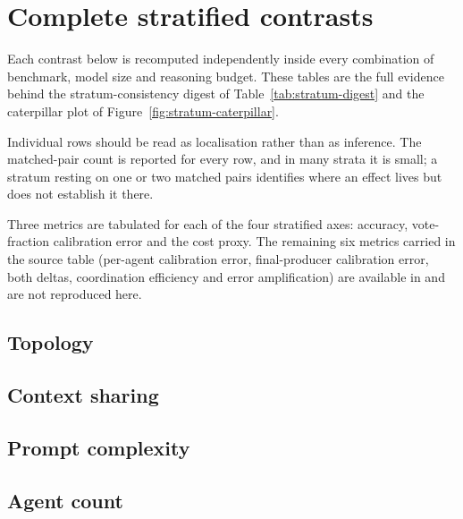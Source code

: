 \section{Complete stratified contrasts}
\label{app:stratified}

Each contrast below is recomputed independently inside every combination of benchmark,
model size and reasoning budget. These tables are the full evidence behind the
stratum-consistency digest of Table~\ref{tab:stratum-digest} and the caterpillar plot of
Figure~\ref{fig:stratum-caterpillar}.

Individual rows should be read as localisation rather than as inference. The
matched-pair count is reported for every row, and in many strata it is small; a stratum
resting on one or two matched pairs identifies where an effect lives but does not
establish it there.

Three metrics are tabulated for each of the four stratified axes: accuracy, vote-fraction
calibration error and the cost proxy. The remaining six metrics carried in the source table
(per-agent calibration error, final-producer calibration error, both deltas, coordination
efficiency and error amplification) are available in
 and are not
reproduced here.

\subsection{Topology}

\clearpage
{}
\clearpage
{}

\clearpage
\subsection{Context sharing}

\clearpage
{}
\clearpage
{}

\clearpage
\subsection{Prompt complexity}

\clearpage
{}
\clearpage
{}

\clearpage
\subsection{Agent count}

\clearpage
{}
\clearpage
{}
